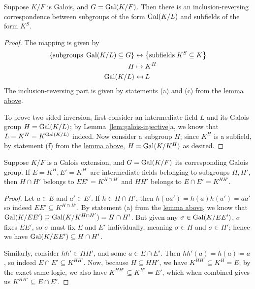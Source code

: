\begin{corollary}\label{cor:galois-correspondence}
    Suppose \(K/F\) is Galois, and \(G = \operatorname{Gal}(K/F)\).
    Then there is an inclusion-reversing correspondence between subgroups of the form \(\operatorname{Gal}(K/L)\)
    and subfields of the form \(K^S\).
\end{corollary}
\begin{proof}
    The mapping is given by
    \begin{align*}
        \Bqty{\text{subgroups}\;\Gal(K/L) \subseteq G} &\leftrightarrow
        \Bqty{\text{subfields}\; K^S \subseteq K} \\
        H &\mapsto K^H \\
        \Gal(K/L) &\mapsfrom L
    \end{align*}
    The inclusion-reversing part is given
    by statements (a) and (c) from the \hyperref[lem:galois-group-properties]{lemma above}.

    To prove two-sided inversion,
    first consider an intermediate field \(L\) and its Galois group \(H = \operatorname{Gal}(K/L)\);
    by Lemma~\ref{lem:galois-injective}a, we know that \(L = K^H = K^{\operatorname{Gal}(K/L)}\) indeed.
    Now consider a subgroup \(H\);
    since \(K^H\) is a subfield,
    by statement (f) from the \hyperref[lem:galois-group-properties]{lemma above},
    \(H = \operatorname{Gal}(K/K^H)\) as desired.
\end{proof}
\begin{corollary}\label{cor:galois-intersection-product}
    Suppose \(K/F\) is a Galois extension, and \(G = \operatorname{Gal}(K/F)\) its corresponding Galois group.
    If \(E = K^H, E' = K^{H'}\) are intermediate fields belonging to subgroups \(H,H'\),
    then \(H \cap H'\) belongs to \(EE' = K^{H \cap H'}\)
    and \(HH'\) belongs to \(E \cap E' = K^{HH'}\).
\end{corollary}
\begin{proof}
    Let \(a \in E\) and \(a' \in E'\).
    If \(h \in H \cap H'\), then \(h(aa') = h(a)h(a') = aa'\)
    so indeed \(EE' \subseteq K^{H \cap H'}\).
    By statement (a) from the \hyperref[lem:galois-group-properties]{lemma above},
    we know that \(\operatorname{Gal}(K/EE') \supseteq \operatorname{Gal}(K/K^{H \cap H'}) = H \cap H'\).
    But given any \(\sigma \in \operatorname{Gal}(K/EE')\), \(\sigma\) fixes \(EE'\),
    so \(\sigma\) must fix \(E\) and \(E'\) individually,
    meaning \(\sigma \in H\) and \(\sigma \in H'\);
    hence we have \(\operatorname{Gal}(K/EE') \subseteq H \cap H'\).

    Similarly, consider \(hh' \in HH'\), and some \(a \in E \cap E'\).
    Then \(hh'(a) = h(a) = a\), so indeed \(E \cap E' \subseteq K^{HH'}\).
    Now, because \(H \subseteq HH'\), we have \(K^{HH'} \subseteq K^H = E\);
    by the exact same logic, we also have \(K^{HH'} \subseteq K^{H'} = E'\),
    which when combined gives us \(K^{HH'} \subseteq E \cap E'\).
\end{proof}

